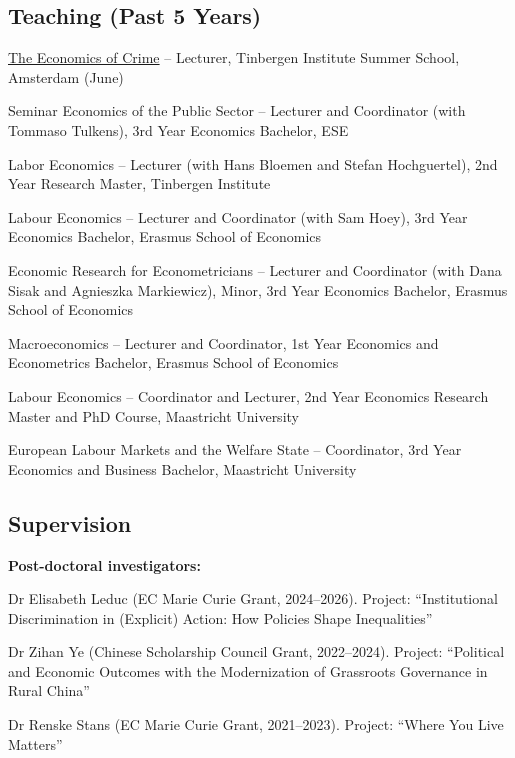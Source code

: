 \documentclass[11pt,a4paper]{article}
\begin{document}
\subsection{Teaching (Past 5 Years)}
\begin{datelist}
  \item[2026] \href{https://tinbergen.nl/the-economics-of-crime}{The Economics of Crime} -- Lecturer, Tinbergen Institute Summer School, Amsterdam (June)
  \item[2024 --] Seminar Economics of the Public Sector -- Lecturer and Coordinator (with Tommaso Tulkens), 3rd Year Economics Bachelor, ESE
  \item[2019 --] Labor Economics -- Lecturer (with Hans Bloemen and Stefan Hochguertel), 2nd Year Research Master, Tinbergen Institute
  \item[2016 --] Labour Economics -- Lecturer and Coordinator (with Sam Hoey), 3rd Year Economics Bachelor, Erasmus School of Economics
  \item[2018 -- 2023] Economic Research for Econometricians -- Lecturer and Coordinator (with Dana Sisak and Agnieszka Markiewicz), Minor, 3rd Year Economics Bachelor, Erasmus School of Economics
  \item[2016 -- 2018] Macroeconomics -- Lecturer and Coordinator, 1st Year Economics and Econometrics Bachelor, Erasmus School of Economics
  \item[2015 -- 2016] Labour Economics -- Coordinator and Lecturer, 2nd Year Economics Research Master and PhD Course, Maastricht University
  \item[2015 -- 2016] European Labour Markets and the Welfare State -- Coordinator, 3rd Year Economics and Business Bachelor, Maastricht University
\end{datelist}

\subsection{Supervision}

\textbf{Post-doctoral investigators:}
\begin{pubs}
  \item Dr Elisabeth Leduc (EC Marie Curie Grant, 2024--2026). Project: ``Institutional Discrimination in (Explicit) Action: How Policies Shape Inequalities''
  \item Dr Zihan Ye (Chinese Scholarship Council Grant, 2022--2024). Project: ``Political and Economic Outcomes with the Modernization of Grassroots Governance in Rural China''
  \item Dr Renske Stans (EC Marie Curie Grant, 2021--2023). Project: ``Where You Live Matters''
\end{pubs}
\end{document}
